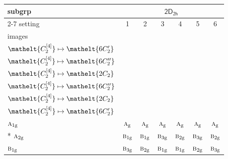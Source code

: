 \documentclass[10pt,a4paper]{article}
\numberwithin{equation}{section}
\newcommand{\eltfont}[1]{{\let\sigma\eltsigma\mathelt{#1}}}
\newcommand{\grp}[1]{\mathsf{#1}}
\newcommand{\irr}[1]{\text{\normalfont\scshape #1}}
\newcommand{\cls}[1]{\eltfont{#1}}
\newcommand{\ptag}[1]{\mathrm{#1}}
\newcommand{\genidx}[2]{#1^{[\mathrm{#2}]}}
\begin{document}
{\small\begin{longtable}{@{}lcccccc@{}}\toprule
subgrp & \multicolumn{6}{c}{\href{2D2h.pdf}{$\grp{2D_{2h}}$}}\\\cmidrule(lr){2-7}
setting & 1 & 2 & 3 & 4 & 5 & 6\\
images & {\scriptsize\begin{tabular}[t]{@{}c@{}}$\cls{\genidx{C_{2}}{2}} \mapsto \cls{2C_{2}}$\\$\cls{\genidx{C_{2}}{4}} \mapsto \cls{6C_{2}'}$\end{tabular}} & {\scriptsize\begin{tabular}[t]{@{}c@{}}$\cls{\genidx{C_{2}}{2}} \mapsto \cls{2C_{2}}$\\$\cls{\genidx{C_{2}}{4}} \mapsto \cls{6C_{2}''}$\end{tabular}} & {\scriptsize\begin{tabular}[t]{@{}c@{}}$\cls{\genidx{C_{2}}{2}} \mapsto \cls{6C_{2}'}$\\$\cls{\genidx{C_{2}}{4}} \mapsto \cls{2C_{2}}$\end{tabular}} & {\scriptsize\begin{tabular}[t]{@{}c@{}}$\cls{\genidx{C_{2}}{2}} \mapsto \cls{6C_{2}'}$\\$\cls{\genidx{C_{2}}{4}} \mapsto \cls{6C_{2}''}$\end{tabular}} & {\scriptsize\begin{tabular}[t]{@{}c@{}}$\cls{\genidx{C_{2}}{2}} \mapsto \cls{6C_{2}''}$\\$\cls{\genidx{C_{2}}{4}} \mapsto \cls{2C_{2}}$\end{tabular}} & {\scriptsize\begin{tabular}[t]{@{}c@{}}$\cls{\genidx{C_{2}}{2}} \mapsto \cls{6C_{2}''}$\\$\cls{\genidx{C_{2}}{4}} \mapsto \cls{6C_{2}'}$\end{tabular}}\\\midrule\endhead
\bottomrule\endfoot\endlastfoot
$\irr{a}_{1\ptag{g}}$ & $\irr{a}_{\ptag{g}}$ & $\irr{a}_{\ptag{g}}$ & $\irr{a}_{\ptag{g}}$ & $\irr{a}_{\ptag{g}}$ & $\irr{a}_{\ptag{g}}$ & $\irr{a}_{\ptag{g}}$\\*
$\irr{a}_{2\ptag{g}}$ & $\irr{b}_{1\ptag{g}}$ & $\irr{b}_{1\ptag{g}}$ & $\irr{b}_{3\ptag{g}}$ & $\irr{b}_{2\ptag{g}}$ & $\irr{b}_{3\ptag{g}}$ & $\irr{b}_{2\ptag{g}}$\\
$\irr{b}_{1\ptag{g}}$ & $\irr{b}_{3\ptag{g}}$ & $\irr{b}_{2\ptag{g}}$ & $\irr{b}_{1\ptag{g}}$ & $\irr{b}_{1\ptag{g}}$ & $\irr{b}_{2\ptag{g}}$ & $\irr{b}_{3\ptag{g}}$\\

\end{longtable}}
\end{document}
